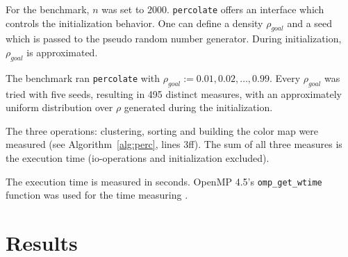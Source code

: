 \documentclass[twoside,11pt]{article}
\def\perc{\texttt{perco\-late}}
\begin{document}
For the benchmark, $n$ was set to $2000$.
\perc{} offers an interface which controls the
initialization behavior.
One can define a density $\rho_{goal}$ and a seed which is
passed to the pseudo random number generator.
During initialization, $\rho_{goal}$ is approximated.

The benchmark ran \perc{} with $\rho_{goal} :=
0.01,0.02,\dots,0.99$. Every $\rho_{goal}$ was tried with
five seeds, resulting in 495 distinct measures, with an
approximately uniform distribution over $\rho$ generated
during the initialization.

The three operations: clustering, sorting and building the
color map were measured (see Algorithm~\ref{alg:perc},
lines 3ff).
The sum of all three measures is the execution time
(io-operations and initialization excluded).

The execution time is measured in seconds.
OpenMP 4.5's \texttt{omp\_get\_wtime} function was used
for the time measuring \citep[see][Chapter 3.4.1]{openmp}.


\section{Results} %
\end{document}
